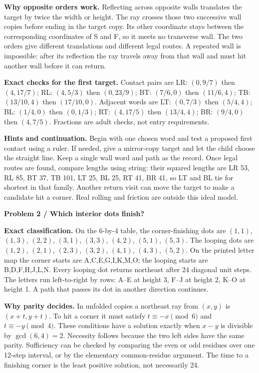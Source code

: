 \documentclass[11pt]{article}
\newcommand{\parttitle}[1]{{\large\bfseries\color{ink}#1}\par}
\newcommand{\labelled}[2]{\textbf{#1} #2\par}
\begin{document}
\labelled{Why opposite orders work.}{Reflecting across opposite walls translates the target by twice the width or height. The ray crosses those two successive wall copies before ending in the target copy. Its other coordinate stays between the corresponding coordinates of S and F, so it meets no transverse wall. The two orders give different translations and different legal routes. A repeated wall is impossible: after its reflection the ray travels away from that wall and must hit another wall before it can return.}
\labelled{Exact checks for the first target.}{Contact pairs are LR: $(0,9/7)$ then $(4,17/7)$; RL: $(4,5/3)$ then $(0,23/9)$; BT: $(7/6,0)$ then $(11/6,4)$; TB: $(13/10,4)$ then $(17/10,0)$. Adjacent words are LT: $(0,7/3)$ then $(5/4,4)$; BL: $(1/4,0)$ then $(0,1/3)$; RT: $(4,17/5)$ then $(13/4,4)$; BR: $(9/4,0)$ then $(4,7/5)$. Fractions are adult checks, not entry requirements.}
\labelled{Hints and continuation.}{Begin with one chosen word and test a proposed first contact using a ruler. If needed, give a mirror-copy target and let the child choose the straight line. Keep a single wall word and path as the record. Once legal routes are found, compare lengths using string: their squared lengths are LR 53, RL 85, BT 37, TB 101, LT 25, BL 25, RT 41, BR 41, so LT and BL tie for shortest in that family. Another return visit can move the target to make a candidate hit a corner. Real rolling and friction are outside this ideal model.}
\newpage
\parttitle{Problem 2 / Which interior dots finish?}
\labelled{Exact classification.}{On the 6-by-4 table, the corner-finishing dots are $(1,1)$, $(1,3)$, $(2,2)$, $(3,1)$, $(3,3)$, $(4,2)$, $(5,1)$, $(5,3)$. The looping dots are $(1,2)$, $(2,1)$, $(2,3)$, $(3,2)$, $(4,1)$, $(4,3)$, $(5,2)$. On the printed letter map the corner starts are A,C,E,G,I,K,M,O; the looping starts are B,D,F,H,J,L,N. Every looping dot returns northeast after 24 diagonal unit steps. The letters run left-to-right by rows: A--E at height 3, F--J at height 2, K--O at height 1. A path that passes its dot in another direction continues.}
\labelled{Why parity decides.}{In unfolded copies a northeast ray from $(x,y)$ is $(x+t,y+t)$. To hit a corner it must satisfy $t\equiv-x\pmod6$ and $t\equiv-y\pmod4$. These conditions have a solution exactly when $x-y$ is divisible by $\gcd(6,4)=2$. Necessity follows because the two left sides have the same parity. Sufficiency can be checked by comparing the even or odd residues over one 12-step interval, or by the elementary common-residue argument. The time to a finishing corner is the least positive solution, not necessarily 24.}
\end{document}
